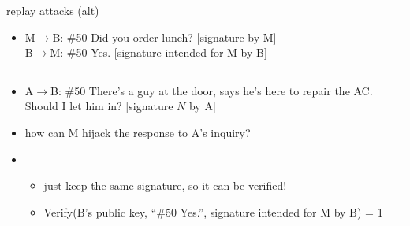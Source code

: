 \begin{frame}{replay attacks (alt)}
    \begin{itemize}
    \item M$\rightarrow$B: \#50 Did you order lunch? [signature by M] \\
          B$\rightarrow$M: \#50 Yes. [signature intended for M by B]  \\
    \hrule
    \item<2-> A$\rightarrow$B: \#50 There's a guy at the door, says he's here to repair the AC. Should I let him in? [signature $N$ by A]
    \vspace{.5cm}
    \item<2-> how can M hijack the response to A's inquiry?
    \item<3-> 
        \begin{itemize}
        \item just keep the same signature, so it can be verified!
        \item Verify(B's public key, ``\#50 Yes.'', signature intended for M by B) = 1
        \end{itemize}
    \end{itemize}
\end{frame}


